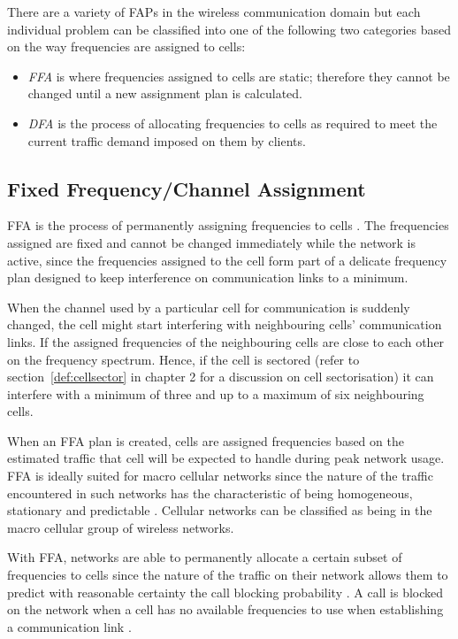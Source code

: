 There are a variety of \gls{FAP}s in the wireless communication domain but each individual problem can be classified into one of the following two categories based on the way frequencies are assigned to cells:
\begin{itemize}
  \item \emph{\gls{FFA}} is where frequencies assigned to cells are static; therefore they cannot be changed until a new assignment plan is calculated\cite{PrinciplesMobileCommunication}.
\item \emph{\gls{DFA}} is the process of allocating frequencies to cells as required to meet the current traffic demand imposed on them by clients\cite{PrinciplesMobileCommunication}. 
\end{itemize}

\subsection{Fixed Frequency/Channel Assignment}
\gls{FFA} is the process of permanently assigning frequencies to cells \cite{PrinciplesMobileCommunication}. The frequencies assigned are fixed and cannot be changed immediately while the network is active, since the frequencies assigned to the cell form part of a delicate frequency plan designed to keep interference on communication links to a minimum\cite{PrinciplesMobileCommunication}. 

When the channel used by a particular cell for communication is suddenly changed, the cell might start interfering with neighbouring cells' communication links. If the assigned frequencies of the neighbouring cells are close to each other on the frequency spectrum. Hence, if the cell is sectored (refer to section~\ref{def:cellsector} in chapter 2 for a discussion on cell sectorisation) it can interfere with a minimum of three and up to a maximum of six neighbouring cells\cite{PrinciplesMobileCommunication}.

When an \gls{FFA} plan is created, cells are assigned frequencies based on the estimated traffic that cell will be expected to handle during peak network usage. \gls{FFA} is ideally suited for macro cellular networks since the nature of the traffic encountered in such networks has the characteristic of being homogeneous, stationary and predictable \cite{PrinciplesMobileCommunication}. Cellular networks can be classified as being in the macro cellular group of wireless networks.

With \gls{FFA}, networks are able to permanently allocate a certain subset of frequencies to cells since the nature of the traffic on their network allows them to predict with reasonable certainty the call blocking probability \cite{PrinciplesMobileCommunication}. A call is blocked on the network when a cell has no available frequencies to use when establishing a communication link \cite{PrinciplesMobileCommunication}.

